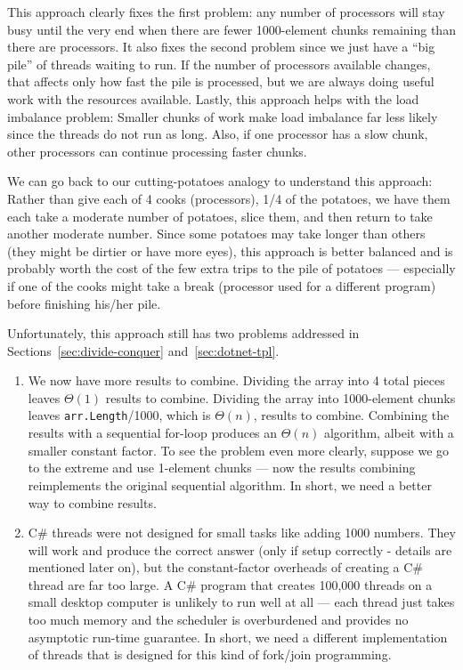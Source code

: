\documentclass[10pt]{article}
\begin{document}
This approach clearly fixes the first problem: any number of
processors will stay busy until the very end when there are fewer
1000-element chunks remaining than there are processors.  It also
fixes the second problem since we just have a ``big pile'' of threads
waiting to run.  If the number of processors available changes, that
affects only how fast the pile is processed, but we are always doing
useful work with the resources available.  Lastly, this approach helps
with the load imbalance problem: Smaller chunks of work make load
imbalance far less likely since the threads do not run as long.  Also,
if one processor has a slow chunk, other processors can continue
processing faster chunks.

We can go back to our cutting-potatoes analogy to understand this
approach: Rather than give each of 4 cooks (processors), 1/4 of the
potatoes, we have them each take a moderate number of potatoes, slice
them, and then return to take another moderate number.  Since some
potatoes may take longer than others (they might be dirtier or have
more eyes), this approach is better balanced and is probably worth the
cost of the few extra trips to the pile of potatoes --- especially if
one of the cooks might take a break (processor used for a different
program) before finishing his/her pile.

Unfortunately, this approach still has two problems addressed in
Sections~\ref{sec:divide-conquer} and~\ref{sec:dotnet-tpl}.
\begin{enumerate}
\item We now have more results to combine.  Dividing the array into 4
  total pieces leaves $\Theta(1)$ results to combine.  Dividing the array
  into 1000-element chunks leaves {\tt arr.Length}/1000, which is
  $\Theta(n)$, results to combine.  Combining the results with a
  sequential for-loop produces an $\Theta(n)$ algorithm, albeit
  with a smaller constant factor.  To see the problem even more
  clearly, suppose we go to the extreme and use 1-element chunks ---
  now the results combining reimplements the original sequential
  algorithm.  In short, we need a better way to combine results.
\item C\# threads were not designed for small tasks like adding
  1000 numbers.  They will work and produce the correct answer 
  (only if setup correctly - details are mentioned later on), but
  the constant-factor overheads of creating a C\# thread are far too
  large.  A C\# program that creates 100,000 threads on a small
  desktop computer is unlikely to run well at all --- each thread just
  takes too much memory and the scheduler is overburdened and provides
  no asymptotic run-time guarantee.  In short, we need a different
  implementation of threads that is designed for this kind of
  fork/join programming.
\end{enumerate}
\end{document}
